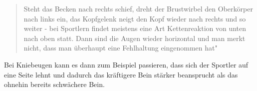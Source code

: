 \begin{quote}
Steht das Becken nach rechts schief, dreht der Brustwirbel den Oberkörper nach links ein, das Kopfgelenk neigt den Kopf wieder nach rechts und so weiter - bei Sportlern findet meistens eine Art Kettenreaktion von unten nach oben statt. Dann sind die Augen wieder horizontal und man merkt nicht, dass man überhaupt eine Fehlhaltung eingenommen hat" \cite{MensHealth}
\end{quote}
Bei Kniebeugen kann es dann zum Beispiel passieren, dass sich der Sportler auf eine Seite lehnt und dadurch das kräftigere Bein stärker beansprucht als das ohnehin bereits schwächere Bein. \\
\\


